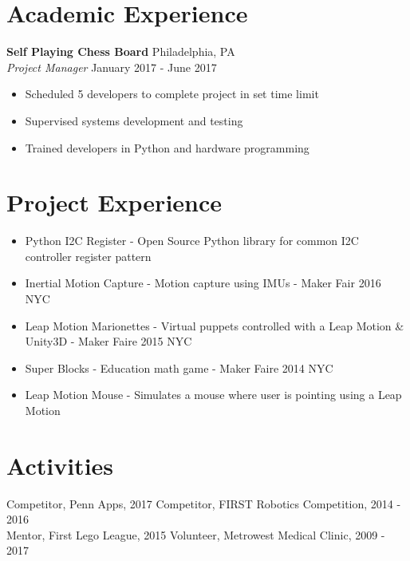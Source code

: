 \documentclass[10pt]{article}
\begin{document}
\begin{flushleft}
\section{Academic Experience}
	\textbf{Self Playing Chess Board} \hfill Philadelphia, PA \\
	\textit{Project Manager} \hfill January 2017 - June 2017 \\
	\begin{itemize}
		\item Scheduled 5 developers to complete project in set time limit
		\item Supervised systems development and testing
		\item Trained developers in Python and hardware programming
	\end{itemize}

\section{Project Experience}
	\begin{itemize}
		\item Python I2C Register - Open Source Python library for common I2C controller register pattern
		\item Inertial Motion Capture - Motion capture using IMUs - Maker Fair 2016 NYC
		\item Leap Motion Marionettes - Virtual puppets controlled with a Leap Motion \& Unity3D - Maker Faire 2015 NYC
		\item Super Blocks - Education math game - Maker Faire 2014 NYC
		\item Leap Motion Mouse - Simulates a mouse where user is pointing using a Leap Motion
	\end{itemize}

\section{Activities}
	Competitor, Penn Apps, 2017 \hfill Competitor, FIRST Robotics Competition, 2014 - 2016 \\
	Mentor, First Lego League, 2015 \hfill Volunteer, Metrowest Medical Clinic, 2009 - 2017

\end{flushleft}
\end{document}
